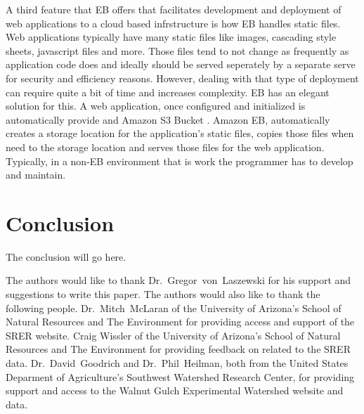 A third feature that EB offers that facilitates development and deployment of 
web applications to a cloud based infrstructure is how EB handles static 
files.  Web applications typically have many static files like images, 
cascading style sheets, javascript files and more.  Those files tend to not 
change as frequently as application code does and ideally should be served 
seperately by a separate serve for security and efficiency reasons.  However, 
dealing with that type of deployment can require quite a bit of time and 
increases complexity.  EB has an elegant solution for this.  A web application, 
once configured and initialized is automatically provide and Amazon 
S3 Bucket \cite{S3Bucket2018}.  Amazon EB, automatically creates a storage 
location for the application's static files, copies those files when need 
to the storage location and serves those files for the web application.  
Typically, in a non-EB environment that is work the programmer has to develop 
and maintain.


\section{Conclusion}
The conclusion will go here.

\begin{acks}
The authors would like to thank Dr.~Gregor~von~Laszewski for his support 
and suggestions to write this paper.  The authors would also like to thank 
the following people.  Dr.~Mitch~McLaran of the University of Arizona's School 
of Natural Resources and The Environment for providing access and support of 
the SRER website.  Craig Wissler of the University of Arizona's School of 
Natural Resources and The Environment for providing feedback on related to the 
SRER data.  Dr.~David~Goodrich and Dr.~Phil~Heilman, both from the United 
States Deparment of Agriculture's Southwest Watershed Research Center, for 
providing support and access to the Walnut Gulch Experimental Watershed website 
and data.
\end{acks}


 
